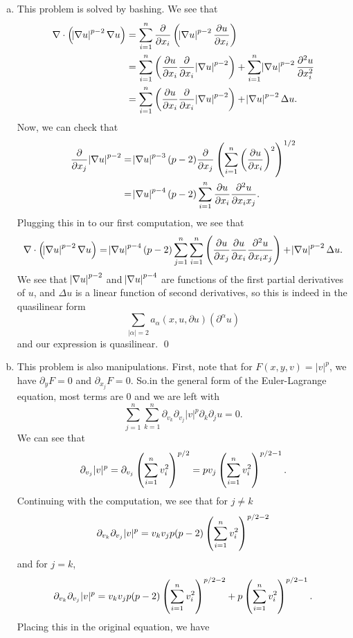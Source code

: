 \documentclass{article}
\newcommand{\D}{\nabla}
\renewcommand{\d}{\partial}
\begin{document}
\begin{enumerate}[(a)]
    \item This problem is solved by bashing. We see that 
    \begin{align*}
        \D \cdot \del{\abs{\D u}^{p-2}\D u} &=\sum_{i=1}^n \frac{\d}{\d x_i} \del{\abs{\D u}^{p-2}\frac{\d u}{\d x_i}} \\ 
        &= \sum_{i=1}^n \del{\frac{\d u}{\d x_i}\frac{\d}{\d x_i}\abs{\D u}^{p-2}}+\sum_{i=1}^n\abs{\D u}^{p-2}\frac{\d^2u}{\d x_i^2}\\
        &= \sum_{i=1}^n \del{\frac{\d u}{\d x_i}\frac{\d}{\d x_i}\abs{\D u}^{p-2}}+\abs{\D u}^{p-2}\Delta u.
    \end{align*}
    Now, we can check that 
    \begin{align*}
        \frac{\d}{\d x_j}\abs{\D u}^{p-2} &= \abs{\D u}^{p-3}(p-2)\frac{\d}{\d x_j} \del{\sum_{i=1}^n \del{\frac{\d u}{\d x_i}}^2}^{1/2} \\
        &= \abs{\D u}^{p-4} (p-2) \sum_{i=1}^n \frac{\d u }{\d x_i}\frac{\d^2 u}{\d x_i x_j}. 
    \end{align*}
    Plugging this in to our first computation, we see that 
    \begin{align*}
        \D \cdot \del{\abs{\D u}^{p-2}\D u} =  \abs{\D u}^{p-4}(p-2) \sum_{j=1}^n \sum_{i=1}^n \del{\frac{\d u}{\d x_j}\frac{\d u }{\d x_i}\frac{\d^2 u}{\d x_i x_j}}+\abs{\D u}^{p-2}\Delta u.
    \end{align*}
    We see that $\abs{\D u}^{p-2}$ and $\abs{\D u}^{p-4}$ are functions of the first partial derivatives of $u$, and $\Delta u$ is a linear function of second derivatives, so this is indeed in the quasilinear form 
    \[\sum_{|\alpha|=2}a_\alpha(x,u,\d u)(\d^\alpha u)\]
    and our expression is quasilinear. \qed
    \item This problem is also manipulations. First, note that for $F(x,y,v) = |v|^p$, we have $\d_y F=0$ and $\d_{x_j} F =0$. So.in the general form of the Euler-Lagrange equation, most terms are 0 and we are left with 
    \[\sum_{j=1}^n\sum_{k=1}^n \d_{v_k}\d_{v_j}|v|^p \d_k\d_j u = 0.\]
    We can see that 
    \[\d_{v_j} |v|^p = \d_{v_j}\del{\sum_{i=1}^n v_i^2}^{p/2} = pv_j \del{\sum_{i=1}^n v_i^2}^{p/2-1}.\]
    Continuing with the computation, we see that for $j \ne k$
    \[\d_{v_k}\d_{v_j} |v|^{p} = v_kv_jp(p-2)\del{\sum_{i=1}^n v_i^2}^{p/2-2}\]
    and for $j =k$, 
    \[\d_{v_k}\d_{v_j} |v|^{p} = v_kv_jp(p-2)\del{\sum_{i=1}^n v_i^2}^{p/2-2} + p\del{\sum_{i=1}^n v_i^2}^{p/2-1}.\]
    Placing this in the original equation, we have 

\end{enumerate}
\end{document}
